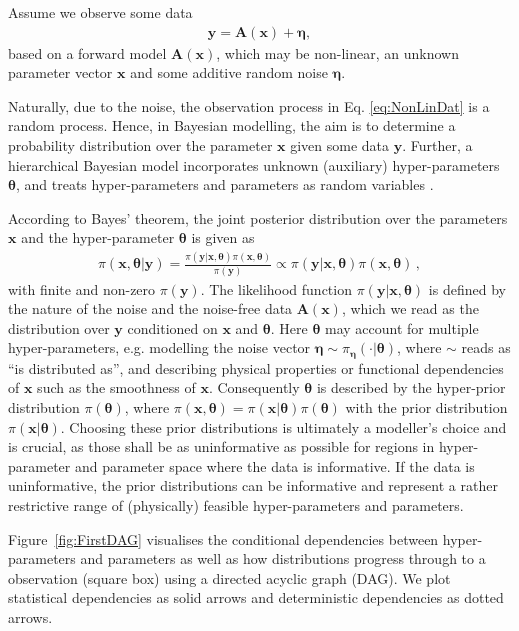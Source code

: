 Assume we observe some data
\begin{align}
	\bm{y} = \bm{A} (\bm{x}) + \bm{\eta},
	\label{eq:NonLinDat}
\end{align}
based on a forward model $\bm{A}(\bm{x})$, which may be non-linear, an unknown parameter vector $\bm{x}$ and some additive random noise $\bm{\eta}$.

Naturally, due to the noise, the observation process in Eq. \ref{eq:NonLinDat} is a random process.
Hence, in Bayesian modelling, the aim is to determine a probability distribution over the parameter $\bm{x}$ given some data $\bm{y}$.
Further, a hierarchical Bayesian model incorporates unknown (auxiliary) hyper-parameters $\bm{\theta}$, and treats hyper-parameters and parameters as random variables \cite[Chapter 3]{kaipio2005statinv}.

According to Bayes' theorem, the joint posterior distribution over the parameters $\bm{x}$ and the hyper-parameter $\bm{\theta}$ is given as
\begin{align}
	\pi(\bm{x},\bm{\theta}|\bm{y}) = \frac{ \pi(\bm{y} | \bm{x}, \bm{\theta} ) \pi(\bm{x}, \bm{\theta})}{\pi(\bm{y})} \propto \pi(\bm{y} | \bm{x}, \bm{\theta} ) \pi(\bm{x}, \bm{\theta}) \, ,
\end{align}
with finite and non-zero $\pi(\bm{y})$.
The likelihood function $\pi(\bm{y}|\bm{x},\bm{\theta})$ is defined by the nature of the noise and the noise-free data $\bm{A}(\bm{x})$, which we read as the distribution over $\bm{y}$ conditioned on $\bm{x}$ and $\bm{\theta}$.
Here $\bm{\theta}$ may account for multiple hyper-parameters, e.g. modelling the noise vector $\bm{\eta} \sim \pi_{\bm{\eta}}(\cdot|\bm{\theta})$, where $\sim$ reads as ``is distributed as'', and describing physical properties or functional dependencies of $\bm{x}$ such as the smoothness of $\bm{x}$.
Consequently $\bm{\theta}$ is described by the hyper-prior distribution $\pi(\bm{\theta})$, where $\pi(\bm{x}, \bm{\theta}) = \pi(\bm{x}|\bm{\theta}) \pi(\bm{\theta})$ with the prior distribution $\pi(\bm{x}|\bm{\theta})$.
Choosing these prior distributions is ultimately a modeller's choice and is crucial, as those shall be as uninformative as possible for regions in hyper-parameter and parameter space where the data is informative.
If the data is uninformative, the prior distributions can be informative and represent a rather restrictive range of (physically) feasible hyper-parameters and parameters.

Figure~\ref{fig:FirstDAG} visualises the conditional dependencies between hyper-parameters and parameters as well as how distributions progress through to a observation (square box) using a directed acyclic graph (DAG).
We plot statistical dependencies as solid arrows and deterministic dependencies as dotted arrows.

